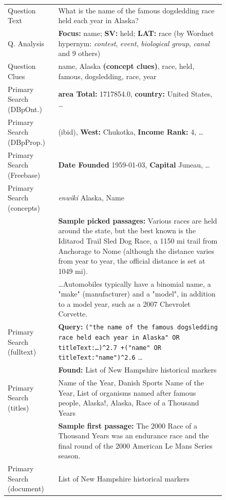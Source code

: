 \documentclass{poster15}
\begin{document}
\begin{figure}[t!]
\renewcommand{\arraystretch}{1.3}
\centering
\footnotesize
\begin{tabular}{|p{1.8cm}p{6cm}|}
\hline
Question Text & What is the name of the famous dogsledding race held each year in Alaska? \\
Q. Analysis & \textbf{Focus:} name; \textbf{SV:} held; \textbf{LAT:} race
	(by Wordnet hypernym: \textit{contest}, \textit{event}, \textit{biological group}, \textit{canal} and 9 others) \\
Question Clues & name, Alaska \textbf{(concept clues)}, race, held, famous, dogsledding, race, year \\ \hline

Primary Search (DBpOnt.) & \textbf{area Total:} 1717854.0, \textbf{country:} United States, \dots \\
Primary Search (DBpProp.) & (ibid), \textbf{West:} Chukotka, \textbf{Income Rank:} 4, \dots \\
Primary Search (Freebase) & \textbf{Date Founded} 1959-01-03, \textbf{Capital} Juneau, \dots \\
Primary Search (concepts) & \textit{enwiki} Alaska, Name \\
	& \textbf{Sample picked passages:} Various races are held around the state, but the best known is the Iditarod Trail Sled Dog Race, a 1150 mi trail from Anchorage to Nome (although the distance varies from year to year, the official distance is set at 1049 mi). \\
	& \dots Automobiles typically have a binomial name, a "make" (manufacturer) and a "model", in addition to a model year, such as a 2007 Chevrolet Corvette.\\
Primary Search (fulltext) & \textbf{Query:} \texttt{("the name of the famous dogsledding race held each year in Alaska" OR titleText:\dots)\^{}2.7 +("name" OR titleText:"name")\^{}2.6} \dots \\
	& \textbf{Found:} List of New Hampshire historical markers \\
Primary Search (titles) & Name of the Year, Danish Sports Name of the Year, List of organisms named after famous people, Alaska!, Alaska, Race of a Thousand Years \\
	& \textbf{Sample first passage:} The 2000 Race of a Thousand Years was an endurance race and the final round of the 2000 American Le Mans Series season. \\
Primary Search (document) & List of New Hampshire historical markers \\ \hline


\end{tabular}
\end{figure}
\end{document}
